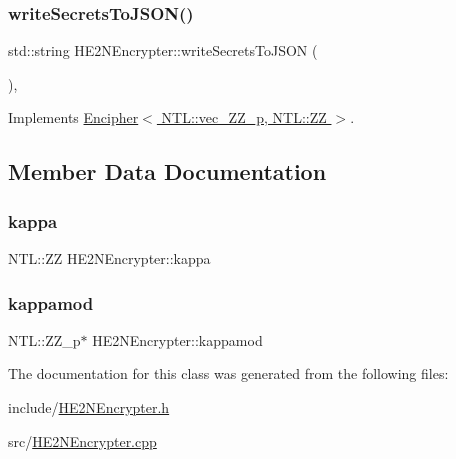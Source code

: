 \subsubsection{\texorpdfstring{write\+Secrets\+To\+J\+S\+O\+N()}{writeSecretsToJSON()}}
{\footnotesize\ttfamily std\+::string H\+E2\+N\+Encrypter\+::write\+Secrets\+To\+J\+S\+ON (\begin{DoxyParamCaption}{ }\end{DoxyParamCaption})\hspace{0.3cm}{\ttfamily [override]}, {\ttfamily [virtual]}}



Implements \hyperlink{classEncipher_a27d3efa1e364c1f0d7def65454c61b85}{Encipher$<$ N\+T\+L\+::vec\+\_\+\+Z\+Z\+\_\+p, N\+T\+L\+::\+Z\+Z $>$}.



\subsection{Member Data Documentation}
\mbox{\label{classHE2NEncrypter_afd61d38d86bd894ba9e0b4f0bc6265b2}} 
\subsubsection{\texorpdfstring{kappa}{kappa}}
{\footnotesize\ttfamily N\+T\+L\+::\+ZZ H\+E2\+N\+Encrypter\+::kappa\hspace{0.3cm}{\ttfamily [private]}}

\mbox{\label{classHE2NEncrypter_ae13c7d0f1d11f2177f7183c50d0614a7}} 
\subsubsection{\texorpdfstring{kappamod}{kappamod}}
{\footnotesize\ttfamily N\+T\+L\+::\+Z\+Z\+\_\+p$\ast$ H\+E2\+N\+Encrypter\+::kappamod\hspace{0.3cm}{\ttfamily [private]}}



The documentation for this class was generated from the following files\+:\begin{DoxyCompactItemize}
\item 
include/\hyperlink{HE2NEncrypter_8h}{H\+E2\+N\+Encrypter.\+h}\item 
src/\hyperlink{HE2NEncrypter_8cpp}{H\+E2\+N\+Encrypter.\+cpp}\end{DoxyCompactItemize}

